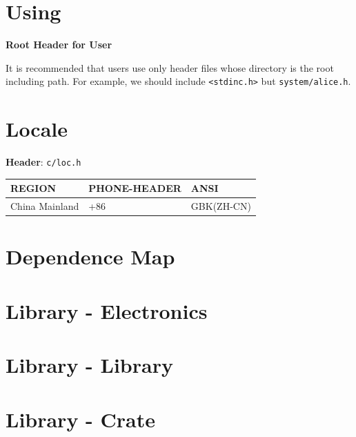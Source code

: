 \section{Using}

\textbf{Root Header for User}

It is recommended that users use only header files whose directory is the root including path. For example, we should include \verb|<stdinc.h>| but \verb|system/alice.h|.



\section{Locale}

\textbf{Header}: \verb|c/loc.h|

\begin{center}

\begin{longtable}{l|l|l}
\hline
\hline
\rowcolor[rgb]{0.95, 0.975, 1}
\textbf{REGION} & \textbf{PHONE-HEADER} & \textbf{ANSI} \\
\hline
China Mainland & +86 & GBK(ZH-CN) \\
\hline
\hline

\end{longtable}

\end{center}



\section{Dependence Map}



\section{Library \mbox{-} Electronics}



\section{Library \mbox{-}  Library}



\section{Library \mbox{-}  Crate}



